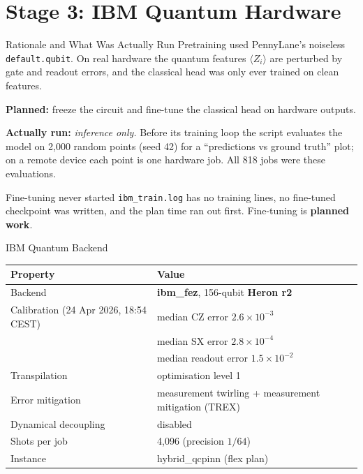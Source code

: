 \documentclass[aspectratio=169]{beamer}
\begin{document}
\section{Stage 3: IBM Quantum Hardware}

\begin{frame}{Rationale and What Was Actually Run}
Pretraining used PennyLane's noiseless \texttt{default.qubit}. On real hardware the quantum features $\langle Z_i\rangle$ are perturbed by gate and readout errors, and the classical head was only ever trained on clean features.

\vspace{0.2cm}
\textbf{Planned:} freeze the circuit and fine-tune the classical head on hardware outputs.

\vspace{0.2cm}
\textbf{Actually run:} \emph{inference only.} Before its training loop the script evaluates the model on 2,000 random points (seed 42) for a ``predictions vs ground truth'' plot; on a remote device each point is one hardware job. All 818 jobs were these evaluations.

\vspace{0.2cm}
\begin{alertblock}{Fine-tuning never started}
\texttt{ibm\_train.log} has no training lines, no fine-tuned checkpoint was written, and the plan time ran out first. Fine-tuning is \textbf{planned work}.
\end{alertblock}
\end{frame}

\begin{frame}{IBM Quantum Backend}
\begin{table}
\centering
\small
\begin{tabular}{ll}
\toprule
Property & Value \\
\midrule
Backend & \textbf{ibm\_fez}, 156-qubit \textbf{Heron r2} \\
Calibration (24 Apr 2026, 18:54 CEST) & median CZ error $2.6\times10^{-3}$ \\
 & median SX error $2.8\times10^{-4}$ \\
 & median readout error $1.5\times10^{-2}$ \\
Transpilation & optimisation level 1 \\
Error mitigation & measurement twirling + measurement mitigation (TREX) \\
Dynamical decoupling & disabled \\
Shots per job & 4,096 (precision $1/64$) \\
Instance & hybrid\_qcpinn (flex plan) \\
\bottomrule
\end{tabular}
\end{table}
\end{frame}
\end{document}
